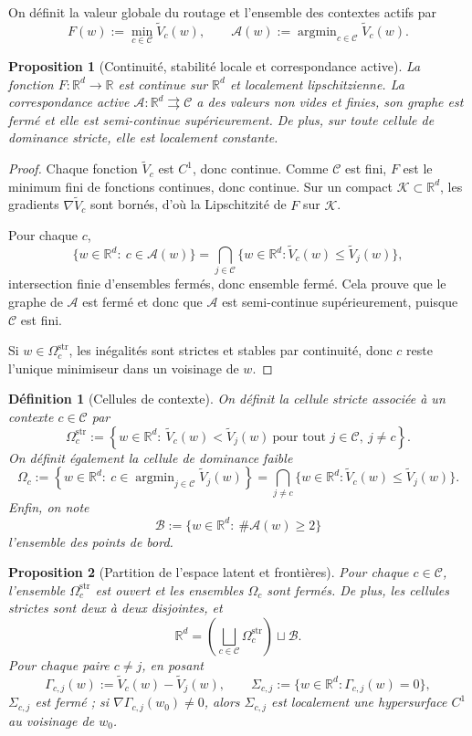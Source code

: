 \documentclass[11pt,a4paper]{article}
\newtheorem{definition}{Définition}[section]
\newtheorem{proposition}{Proposition}[section]
\DeclareMathOperator{\argmin}{argmin}
\newcommand{\R}{\mathbb R}
\newcommand{\Ccal}{\mathcal C}
\begin{document}
On définit la valeur globale du routage et l'ensemble des contextes actifs par
\[
F(w):=\min_{c\in\Ccal}\widetilde V_c(w),
\qquad
\mathcal A(w):=\argmin_{c\in\Ccal}\widetilde V_c(w).
\]

\begin{proposition}[Continuité, stabilité locale et correspondance active]
La fonction \(F:\R^d\to\R\) est continue sur \(\R^d\) et localement lipschitzienne. La correspondance active \(\mathcal A:\R^d\rightrightarrows\Ccal\) a des valeurs non vides et finies, son graphe est fermé et elle est semi-continue supérieurement. De plus, sur toute cellule de dominance stricte, elle est localement constante.
\end{proposition}

\begin{proof}
Chaque fonction \(\widetilde V_c\) est \(C^1\), donc continue. Comme \(\Ccal\) est fini, \(F\) est le minimum fini de fonctions continues, donc continue. Sur un compact \(\mathcal K\subset\R^d\), les gradients \(\nabla\widetilde V_c\) sont bornés, d'où la Lipschitzité de \(F\) sur \(\mathcal K\).

Pour chaque \(c\),
\[
\{w\in\R^d:\ c\in\mathcal A(w)\}
=
\bigcap_{j\in\Ccal}\{w\in\R^d:\widetilde V_c(w)\le \widetilde V_j(w)\},
\]
intersection finie d'ensembles fermés, donc ensemble fermé. Cela prouve que le graphe de \(\mathcal A\) est fermé et donc que \(\mathcal A\) est semi-continue supérieurement, puisque \(\Ccal\) est fini.

Si \(w\in\Omega_c^{\mathrm{str}}\), les inégalités sont strictes et stables par continuité, donc \(c\) reste l'unique minimiseur dans un voisinage de \(w\).
\end{proof}

\begin{definition}[Cellules de contexte]
On définit la cellule stricte associée à un contexte \(c\in\Ccal\) par
\[
\Omega_c^{\mathrm{str}}
:=
\left\{
w\in\R^d:\ \widetilde V_c(w)<\widetilde V_j(w)\ \text{pour tout }j\in\Ccal,\ j\neq c
\right\}.
\]
On définit également la cellule de dominance faible
\[
\Omega_c
:=
\left\{
w\in\R^d:\ c\in\argmin_{j\in\Ccal}\widetilde V_j(w)
\right\}
=
\bigcap_{j\neq c}\{w\in\R^d:\widetilde V_c(w)\le \widetilde V_j(w)\}.
\]
Enfin, on note
\[
\mathcal B:=\{w\in\R^d:\ \#\mathcal A(w)\ge 2\}
\]
l'ensemble des points de bord.
\end{definition}

\begin{proposition}[Partition de l'espace latent et frontières]
Pour chaque \(c\in\Ccal\), l'ensemble \(\Omega_c^{\mathrm{str}}\) est ouvert et les ensembles \(\Omega_c\) sont fermés. De plus, les cellules strictes sont deux à deux disjointes, et
\[
\R^d
=
\left(\bigsqcup_{c\in\Ccal}\Omega_c^{\mathrm{str}}\right)\sqcup \mathcal B.
\]
Pour chaque paire \(c\neq j\), en posant
\[
\Gamma_{c,j}(w):=\widetilde V_c(w)-\widetilde V_j(w),
\qquad
\Sigma_{c,j}:=\{w\in\R^d:\Gamma_{c,j}(w)=0\},
\]
\(\Sigma_{c,j}\) est fermé ; si \(\nabla\Gamma_{c,j}(w_0)\neq 0\), alors \(\Sigma_{c,j}\) est localement une hypersurface \(C^1\) au voisinage de \(w_0\).
\end{proposition}
\end{document}
